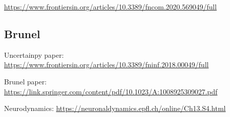 \url{https://www.frontiersin.org/articles/10.3389/fncom.2020.569049/full}

\subsection{Brunel}

Uncertainpy paper:
\url{https://www.frontiersin.org/articles/10.3389/fninf.2018.00049/full}

Brunel paper: 
\url{https://link.springer.com/content/pdf/10.1023/A:1008925309027.pdf} 

Neurodynamics: 
\url{https://neuronaldynamics.epfl.ch/online/Ch13.S4.html}